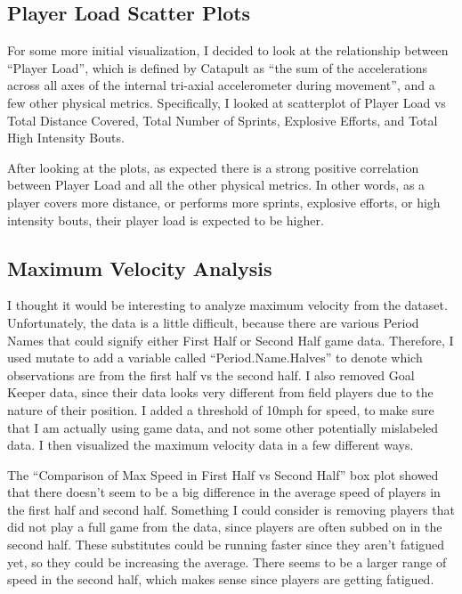 \documentclass[
  letterpaper,
  DIV=11,
  numbers=noendperiod]{scrartcl}
\begin{document}
\hypertarget{player-load-scatter-plots}{%
\subsection{Player Load Scatter Plots}\label{player-load-scatter-plots}}

For some more initial visualization, I decided to look at the
relationship between ``Player Load'', which is defined by Catapult as
``the sum of the accelerations across all axes of the internal tri-axial
accelerometer during movement'', and a few other physical metrics.
Specifically, I looked at scatterplot of Player Load vs Total Distance
Covered, Total Number of Sprints, Explosive Efforts, and Total High
Intensity Bouts.

After looking at the plots, as expected there is a strong positive
correlation between Player Load and all the other physical metrics. In
other words, as a player covers more distance, or performs more sprints,
explosive efforts, or high intensity bouts, their player load is
expected to be higher.

\hypertarget{maximum-velocity-analysis}{%
\subsection{Maximum Velocity Analysis}\label{maximum-velocity-analysis}}

I thought it would be interesting to analyze maximum velocity from the
dataset. Unfortunately, the data is a little difficult, because there
are various Period Names that could signify either First Half or Second
Half game data. Therefore, I used mutate to add a variable called
``Period.Name.Halves'' to denote which observations are from the first
half vs the second half. I also removed Goal Keeper data, since their
data looks very different from field players due to the nature of their
position. I added a threshold of 10mph for speed, to make sure that I am
actually using game data, and not some other potentially mislabeled
data. I then visualized the maximum velocity data in a few different
ways.

The ``Comparison of Max Speed in First Half vs Second Half'' box plot
showed that there doesn't seem to be a big difference in the average
speed of players in the first half and second half. Something I could
consider is removing players that did not play a full game from the
data, since players are often subbed on in the second half. These
substitutes could be running faster since they aren't fatigued yet, so
they could be increasing the average. There seems to be a larger range
of speed in the second half, which makes sense since players are getting
fatigued.
\end{document}
